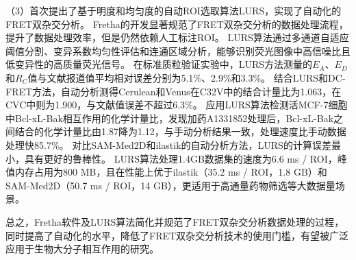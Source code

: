 \begin{cabstract}
（3）首次提出了基于明度和均匀度的自动ROI选取算法LURS，实现了自动化的FRET双杂交分析。
Fretha的开发显著规范了FRET双杂交分析的数据处理流程，提升了数据处理效率，但是仍然依赖人工标注ROI。
LURS算法通过多通道自适应阈值分割、变异系数均匀性评估和连通区域分析，能够识别荧光图像中高信噪比且低变异性的高质量荧光信号。
在标准质粒验证实验中，LURS方法测量的$E_{A}$、$E_{D}$和$R_C$值与文献报道值平均相对误差分别为5.1\%、2.9\%和3.3\%。
结合LURS和DC-FRET方法，自动分析测得Cerulean和Venus在C32V中的结合计量比为1.063，在CVC中则为1.900，与文献值误差不超过6.3\%。
应用LURS算法检测活MCF-7细胞中Bcl-xL-Bak相互作用的化学计量比，发现加药A1331852处理后，Bcl-xL-Bak之间结合的化学计量比由1.87降为1.12，与手动分析结果一致，处理速度比手动数据处理快85.7\%。
对比SAM-Med2D和ilastik的自动分析方法，LURS的计算误差最小，具有更好的鲁棒性。
LURS算法处理1.4GB数据集的速度为6.6 ms / ROI，峰值内存占用为800 MB，且在性能上优于ilastik（35.2 ms / ROI，1.8 GB）和SAM-Med2D（50.7 ms / ROI，14 GB），更适用于高通量药物筛选等大数据量场景。

总之，Fretha软件及LURS算法简化并规范了FRET双杂交分析数据处理的过程，同时提高了自动化的水平，降低了FRET双杂交分析技术的使用门槛，有望被广泛应用于生物大分子相互作用的研究。
\end{cabstract}
\vspace{3pt}

